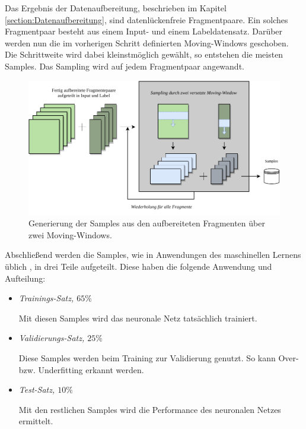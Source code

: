 \documentclass[
12pt, %
toc=listofnumbered, %
toc=chapterentrydotfill, %
numbers=noenddot, %
captions=tableheading, %
bibliography=numbered
]{scrreprt}
\newcommand{\qm}[1]{\glqq#1\grqq{}} %
\begin{document}
Das Ergebnis der Datenaufbereitung, beschrieben im Kapitel \ref{section:Datenaufbereitung}, sind datenlückenfreie Fragmentpaare. Ein solches Fragmentpaar besteht aus einem Input- und einem Labeldatensatz. Darüber werden nun die im vorherigen Schritt definierten Moving-Windows \qm{geschoben}. Die Schrittweite wird dabei kleinstmöglich gewählt, so entstehen die meisten Samples. Das Sampling wird auf jedem Fragmentpaar angewandt.

\begin{figure}[tph]
	\begin{center}
		\includegraphics[]{./images/sampling.pdf}
		\caption{Generierung der Samples aus den aufbereiteten Fragmenten über zwei Moving-Windows.}
		\label{fig:sampling}
	\end{center}
\end{figure}

Abschließend werden die Samples, wie in Anwendungen des maschinellen Lernens üblich \cite{2020_Shah_TrainValidationTest}, in drei Teile aufgeteilt. Diese haben die folgende Anwendung und Aufteilung:

\begin{itemize}
	\item \textit{Trainings-Satz, $65\%$}
	
	Mit diesen Samples wird das neuronale Netz tatsächlich trainiert. 

	\item \textit{Validierungs-Satz, $25\%$}
	
	Diese Samples werden beim Training zur Validierung genutzt. So kann Over- bzw. Underfitting erkannt werden.

	\item \textit{Test-Satz, $10\%$}
	
	Mit den restlichen Samples wird die Performance des neuronalen Netzes ermittelt. 

\end{itemize}
\end{document}
